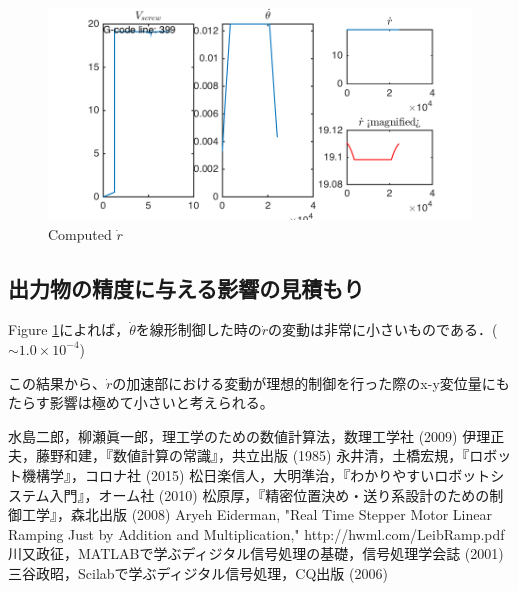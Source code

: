\documentclass[twocolumn,oneside,a4paper]{article}
\begin{document}
\begin{figure}[h]
    \includegraphics[bb=0 0 432 216,width=1\columnwidth]{compute_rdot_screenshot.png}
    \caption{Computed $\dot r$}
   \label{eq:rdot_simulation}
\end{figure}

\subsection{出力物の精度に与える影響の見積もり}
Figure \ref{eq:rdot_simulation}によれば，$\dot{\theta}$を線形制御した時の$\dot r$の変動は非常に小さいものである．($\sim 1.0 \times 10^{-4}$)

この結果から、$\dot r$の加速部における変動が理想的制御を行った際のx-y変位量にもたらす影響は極めて小さいと考えられる。



\begin{thebibliography}{99}
    水島二郎，柳瀬眞一郎，理工学のための数値計算法，数理工学社 (2009)
   伊理正夫，藤野和建，『数値計算の常識』，共立出版 (1985)
    永井清，土橋宏規，『ロボット機構学』，コロナ社 (2015)
     松日楽信人，大明準治，『わかりやすいロボットシステム入門』，オーム社 (2010)
     松原厚，『精密位置決め・送り系設計のための制御工学』，森北出版 (2008)
   Aryeh Eiderman, "Real Time Stepper Motor Linear Ramping Just by Addition and Multiplication," http://hwml.com/LeibRamp.pdf
    川又政征，MATLABで学ぶディジタル信号処理の基礎，信号処理学会誌 (2001)
    三谷政昭，Scilabで学ぶディジタル信号処理，CQ出版 (2006)
\end{thebibliography}
\end{document}
